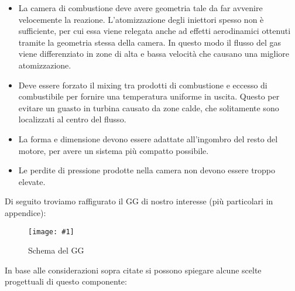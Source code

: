 \documentclass[11pt,a4paper,twocolumn]{article}
\newcommand{\figura}[3]{
\begin{figure}[H]
	\centering
	\texttt{[image: \#1]}
	\caption{#2}
	\label{fig:#3}
\end{figure}
}
\begin{document}
\begin{itemize}[wide,itemsep=3pt,topsep=3pt]

\item
La camera di combustione deve avere geometria tale da far avvenire velocemente la reazione. L’atomizzazione degli iniettori spesso non è sufficiente, per cui essa viene relegata anche ad effetti aerodinamici ottenuti tramite la geometria stessa della camera. In questo modo il flusso del gas viene differenziato in zone di alta e bassa velocità che causano una migliore atomizzazione.
\item
Deve essere forzato il mixing tra prodotti di combustione e eccesso di combustibile per fornire una temperatura uniforme in uscita. Questo per evitare un guasto in turbina causato da zone calde, che solitamente sono localizzati al centro del flusso. 
\item
La forma e dimensione devono essere adattate all'ingombro del resto del motore, per avere un sistema più compatto possibile.
\item
Le perdite di pressione prodotte nella camera non devono essere troppo elevate. 

\end{itemize}

Di seguito troviamo raffigurato il GG di nostro interesse (più particolari in appendice):

\figura{gg_2d_scheme}{Schema del GG}{GG_2d}

In base alle considerazioni sopra citate si possono spiegare alcune scelte progettuali di questo componente:
\end{document}
